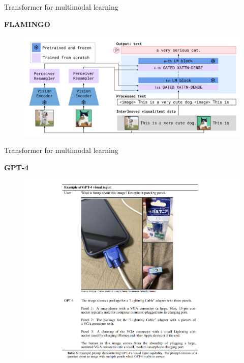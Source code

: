 
\begin{vbframe}{Transformer for multimodal learning}

\vfill

\textbf{FLAMINGO}

\begin{figure}
	\centering
		\includegraphics[width=.8\textwidth]{figure/flamingo.png}\\ 
\end{figure}

\vfill

\end{vbframe}


\begin{vbframe}{Transformer for multimodal learning}

\textbf{GPT-4}

\begin{figure}
	\centering
		\includegraphics[width=.7\textwidth]{figure/gpt4.png}\\ 
\end{figure}

\end{vbframe}


\endlecture

